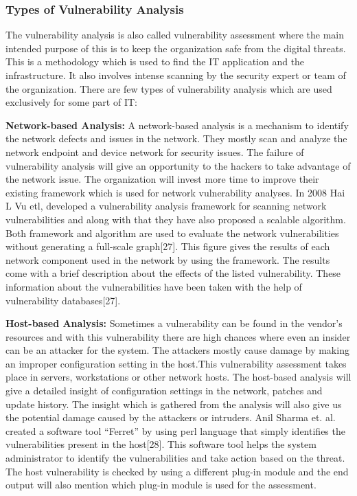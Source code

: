 \subsubsection{Types of Vulnerability Analysis}
The vulnerability analysis is also called vulnerability assessment where the main intended purpose of this is to keep the organization safe from the digital threats. This is a methodology which is used to find the IT application and the infrastructure. It also involves intense scanning by the security expert or team of the organization. There are few types of vulnerability analysis which are used exclusively for some part of IT:

{\bf Network-based Analysis:} A network-based analysis is a mechanism to identify the network defects and issues in the network. They mostly scan and analyze the network endpoint and device network for security issues. The failure of vulnerability analysis will give an opportunity to the hackers to take advantage of the network issue. The organization will invest more time to improve their existing framework which is used for network vulnerability analyses. In 2008 Hai L Vu etl, developed a vulnerability analysis framework for scanning network vulnerabilities and along with that they have also proposed a scalable algorithm. Both framework and algorithm are used to evaluate the network vulnerabilities without generating a full-scale graph[27]. This figure gives the results of each network component used in the network by using the framework. The results come with a brief description about the effects of the listed vulnerability. These information about the vulnerabilities have been taken with the help of vulnerability databases[27].

{\bf Host-based Analysis:} Sometimes a vulnerability can be found in the vendor's resources and with this vulnerability there are high chances where even an insider can be an attacker for the system. The attackers mostly cause damage by making an improper configuration setting in the host.This vulnerability assessment takes place in servers, workstations or other network hosts. The host-based analysis will give a detailed insight of configuration settings in the network, patches and update history. The insight which is gathered from the analysis will also give us the potential damage caused by the attackers or intruders. Anil Sharma et. al. created a software tool “Ferret” by using perl language that simply identifies the vulnerabilities present in the host[28]. This software tool helps the system administrator to identify the vulnerabilities and take action based on the threat. The host vulnerability is checked by using a different plug-in module and the end output will also mention which plug-in module is used for the assessment.

